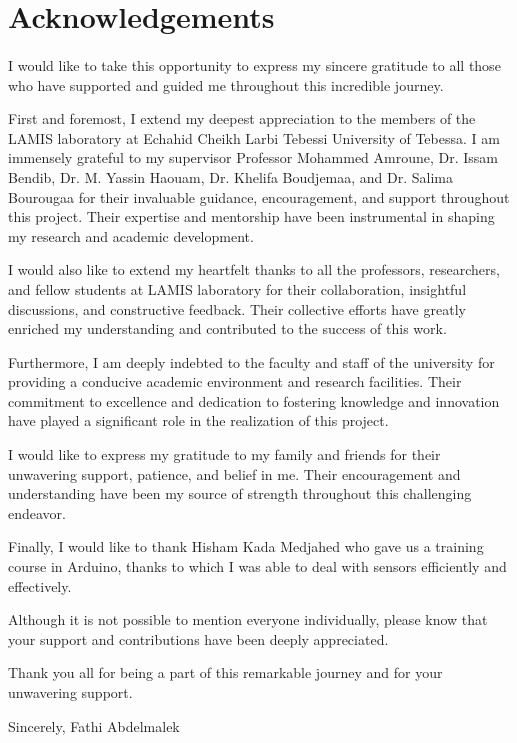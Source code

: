 \section*{Acknowledgements}
\paragraph{}
I would like to take this opportunity to express my sincere gratitude to all those who have supported and guided me throughout this incredible journey.

First and foremost, I extend my deepest appreciation to the members of the LAMIS laboratory at Echahid Cheikh Larbi Tebessi University of Tebessa. I am immensely grateful to my supervisor Professor Mohammed Amroune, Dr. Issam Bendib, Dr. M. Yassin Haouam, Dr. Khelifa Boudjemaa, and Dr. Salima Bourougaa for their invaluable guidance, encouragement, and support throughout this project. Their expertise and mentorship have been instrumental in shaping my research and academic development.

I would also like to extend my heartfelt thanks to all the professors, researchers, and fellow students at LAMIS laboratory for their collaboration, insightful discussions, and constructive feedback. Their collective efforts have greatly enriched my understanding and contributed to the success of this work.

Furthermore, I am deeply indebted to the faculty and staff of the university for providing a conducive academic environment and research facilities. Their commitment to excellence and dedication to fostering knowledge and innovation have played a significant role in the realization of this project.

I would like to express my gratitude to my family and friends for their unwavering support, patience, and belief in me. Their encouragement and understanding have been my source of strength throughout this challenging endeavor.

Finally, I would like to thank Hisham Kada Medjahed who gave us a training course in Arduino, thanks to which I was able to deal with sensors efficiently and effectively.

Although it is not possible to mention everyone individually, please know that your support and contributions have been deeply appreciated.

Thank you all for being a part of this remarkable journey and for your unwavering support.

Sincerely,
Fathi Abdelmalek
